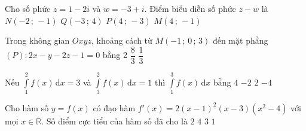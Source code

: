\begin{ex}%
	Cho số phức $ z=1-2i$ và $w=-3+i$. Điểm biểu diễn số phức $ z-w$ là
	\choice
	{$ N\left(-2\,;\,-1\right)$}
	{$ Q\left(-3\,;\,4\right)$}
	{\True $ P\left(4\,;\,-3\right)$}
	{$ M\left(4\,;\,-1\right)$}
\end{ex}

\begin{ex}%
	Trong không gian $ Oxyz$, khoảng cách từ $ M\left(-1\,;\,0\,;\,3\right)$ đến mặt phẳng $(P)\colon2x-y-2z-1=0$ bằng
	\choice
	{}
	{2}
	{$\dfrac{8}{3}$}
	{$\dfrac{1}{3}$}
\end{ex}

\begin{ex}%
	Nếu $\displaystyle\int\limits_1^2f(x)\mathrm{\,d}x=3$ và $\displaystyle\int\limits_3^2f(x)\mathrm{\,d}x=1$ thì $\displaystyle\int\limits_1^3f(x)\mathrm{\,d}x$ bằng
	\choice
	{$ 4$}
	{$-2$}
	{\True $ 2$}
	{$-4$}
\end{ex}

\begin{ex}%
	Cho hàm số $ y=f(x)$ có đạo hàm $f'(x)=2(x-1)^2(x-3)(x^2-4)$ với mọi $ x\in\mathbb{R}$. Số điểm cực tiểu của hàm số đã cho là
	\choice
	{\True $ 2$}
	{$ 4$}
	{$ 3$}
	{$ 1$}
\end{ex}

